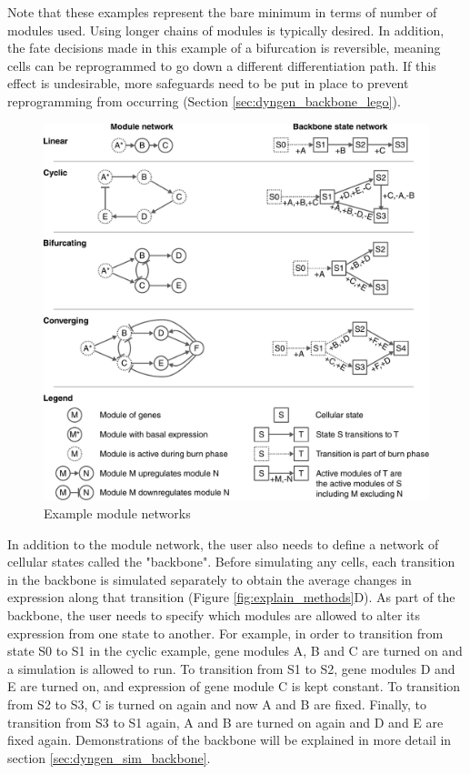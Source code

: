 Note that these examples represent the bare minimum in terms of number of modules used. Using longer chains of modules is typically desired. In addition, the fate decisions made in this example of a bifurcation is reversible, meaning cells can be reprogrammed to go down a different differentiation path. If this effect is undesirable, more safeguards need to be put in place to prevent reprogramming from occurring (Section \ref{sec:dyngen_backbone_lego}).

\begin{figure}[htb!]
	\centering
	\includegraphics[width=\LARGEfigure]{fig/example_backbones} 
	\caption{Example module networks}
	\label{fig:example_backbones}
\end{figure}

In addition to the module network, the user also needs to define a network of cellular states called the "backbone". Before simulating any cells, each transition in the backbone is simulated separately to obtain the average changes in expression along that transition (Figure \ref{fig:explain_methods}D). As part of the backbone, the user needs to specify which modules are allowed to alter its expression from one state to another. For example, in order to transition from state S0 to S1 in the cyclic example, gene modules A, B and C are turned on and a simulation is allowed to run. To transition from S1 to S2, gene modules D and E are turned on, and expression of gene module C is kept constant. To transition from S2 to S3, C is turned on again and now A and B are fixed. Finally, to transition from S3 to S1 again, A and B are turned on again and D and E are fixed again. Demonstrations of the backbone will be explained in more detail in section \ref{sec:dyngen_sim_backbone}.

